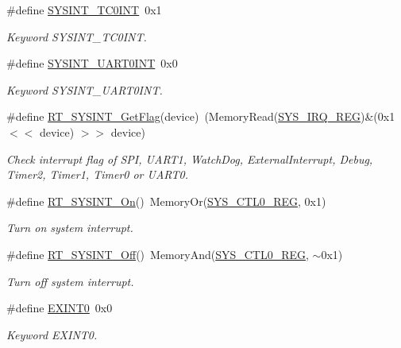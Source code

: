 \begin{DoxyCompactItemize}
\#define \mbox{\hyperlink{a00011_afda418bf07550de9ce626627e3cc46d0}{S\+Y\+S\+I\+N\+T\+\_\+\+T\+C0\+I\+NT}}~0x1
\begin{DoxyCompactList}\small\item\em Keyword S\+Y\+S\+I\+N\+T\+\_\+\+T\+C0\+I\+NT. \end{DoxyCompactList}\item 
\#define \mbox{\hyperlink{a00011_a5443d7bbceafb7ab2592b01489f23499}{S\+Y\+S\+I\+N\+T\+\_\+\+U\+A\+R\+T0\+I\+NT}}~0x0
\begin{DoxyCompactList}\small\item\em Keyword S\+Y\+S\+I\+N\+T\+\_\+\+U\+A\+R\+T0\+I\+NT. \end{DoxyCompactList}\item 
\#define \mbox{\hyperlink{a00011_a397366295a7d6d3ed47e5e3d69549448}{R\+T\+\_\+\+S\+Y\+S\+I\+N\+T\+\_\+\+Get\+Flag}}(device)~(Memory\+Read(\mbox{\hyperlink{a00020_adadaa0ab1ebbd7ba9b70dfd24c3ed44da9c4ce03a199984a23165617318767eca}{S\+Y\+S\+\_\+\+I\+R\+Q\+\_\+\+R\+EG}})\&(0x1 $<$$<$ device) $>$$>$ device)
\begin{DoxyCompactList}\small\item\em Check interrupt flag of S\+PI, U\+A\+R\+T1, Watch\+Dog, External\+Interrupt, Debug, Timer2, Timer1, Timer0 or U\+A\+R\+T0. \end{DoxyCompactList}\item 
\#define \mbox{\hyperlink{a00011_a5ddacb2147f802d2af2f507e41043504}{R\+T\+\_\+\+S\+Y\+S\+I\+N\+T\+\_\+\+On}}()~Memory\+Or(\mbox{\hyperlink{a00020_adadaa0ab1ebbd7ba9b70dfd24c3ed44dab61d9968d782d6c00e9de838e38913f5}{S\+Y\+S\+\_\+\+C\+T\+L0\+\_\+\+R\+EG}}, 0x1)
\begin{DoxyCompactList}\small\item\em Turn on system interrupt. \end{DoxyCompactList}\item 
\#define \mbox{\hyperlink{a00011_a9c68b82296205323f01358d9a27813a9}{R\+T\+\_\+\+S\+Y\+S\+I\+N\+T\+\_\+\+Off}}()~Memory\+And(\mbox{\hyperlink{a00020_adadaa0ab1ebbd7ba9b70dfd24c3ed44dab61d9968d782d6c00e9de838e38913f5}{S\+Y\+S\+\_\+\+C\+T\+L0\+\_\+\+R\+EG}}, $\sim$0x1)
\begin{DoxyCompactList}\small\item\em Turn off system interrupt. \end{DoxyCompactList}\item 
\#define \mbox{\hyperlink{a00011_a2e3f727d359d26314631842394f4a223}{E\+X\+I\+N\+T0}}~0x0
\begin{DoxyCompactList}\small\item\em Keyword E\+X\+I\+N\+T0. \end{DoxyCompactList}\item 

\end{DoxyCompactItemize}
